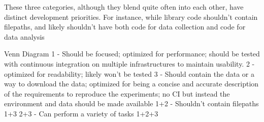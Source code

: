 \documentclass[12pt, english, course]{lecture}
\begin{document}
These three categories, although they blend quite often into each other, have distinct development priorities.
For instance, while library code shouldn't contain filepaths, and likely shouldn't have both code for data collection and code for data analysis

Venn Diagram
    1 - Should be focused; optimized for performance; should be tested with continuous integration on multiple infrastructures to maintain usability.
    2 - optimized for readability; likely won't be tested
    3 - Should contain the data or a way to download the data; optimized for being a concise and accurate description of the requirements to reproduce the experiments; no CI but instead the environment and data should be made available
    1+2 - Shouldn't contain filepaths
    1+3
    2+3 - Can perform a variety of tasks
    1+2+3
\end{document}
